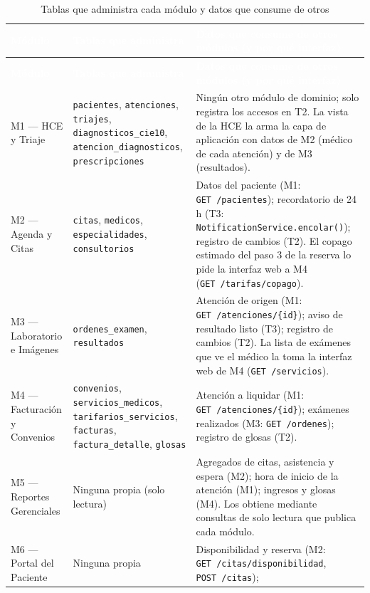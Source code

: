 \documentclass[11pt,a4paper]{article}
\newcommand{\cab}[1]{\textcolor{white}{\textbf{#1}}}
\newcommand{\ep}[2]{{\footnotesize\texttt{\textcolor{guinda}{#1}~#2}}}
\begin{document}
\begin{xltabular}{\linewidth}{|P{2.9cm}|P{4.6cm}|L|}
  \caption{Tablas que administra cada módulo y datos que consume de otros}\label{tab:propiedad}\\
  \hline
  \cab{Módulo} & \cab{Tablas que administra} & \cab{Datos que consume de otros módulos (y por qué interfaz)} \\ \hline
  \endfirsthead
  \hline
  \cab{Módulo} & \cab{Tablas que administra} & \cab{Datos que consume de otros módulos (y por qué interfaz)} \\ \hline
  \endhead
  M1 --- HCE y Triaje &
    \texttt{pacientes}, \texttt{atenciones}, \texttt{triajes}, \texttt{diagnosticos\_cie10},
    \texttt{atencion\_diagnosticos}, \texttt{prescripciones} &
    Ningún otro módulo de dominio; solo registra los accesos en T2. La vista de la HCE la arma
    la capa de aplicación con datos de M2 (médico de cada atención) y de M3 (resultados). \\ \hline
  M2 --- Agenda y Citas &
    \texttt{citas}, \texttt{medicos}, \texttt{especialidades}, \texttt{consultorios} &
    Datos del paciente (M1: \ep{GET}{/pacientes}); recordatorio de 24 h
    (T3: {\footnotesize\texttt{NotificationService.encolar()}}); registro de cambios (T2). El copago
    estimado del paso 3 de la reserva lo pide la interfaz web a M4 (\ep{GET}{/tarifas/copago}). \\ \hline
  M3 --- Laboratorio e Imágenes &
    \texttt{ordenes\_examen}, \texttt{resultados} &
    Atención de origen (M1: \ep{GET}{/atenciones/\{id\}}); aviso de resultado listo (T3); registro
    de cambios (T2). La lista de exámenes que ve el médico la toma la interfaz web de M4
    (\ep{GET}{/servicios}). \\ \hline
  M4 --- Facturación y Convenios &
    \texttt{convenios}, \texttt{servicios\_medicos}, \texttt{tarifarios\_servicios},
    \texttt{facturas}, \texttt{factura\_detalle}, \texttt{glosas} &
    Atención a liquidar (M1: \ep{GET}{/atenciones/\{id\}}); exámenes realizados
    (M3: \ep{GET}{/ordenes}); registro de glosas (T2). \\ \hline
  M5 --- Reportes Gerenciales &
    Ninguna propia (solo lectura) &
    Agregados de citas, asistencia y espera (M2); hora de inicio de la atención (M1); ingresos
    y glosas (M4). Los obtiene mediante consultas de solo lectura que publica cada módulo. \\ \hline
  M6 --- Portal del Paciente &
    Ninguna propia &
    Disponibilidad y reserva (M2: \ep{GET}{/citas/disponibilidad}, \ep{POST}{/citas});

\end{xltabular}
\end{document}
